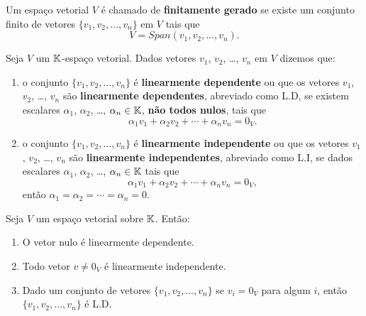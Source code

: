 \documentclass{beamer}
\begin{document}
\begin{frame}
  \begin{definicao}
    Um espaço vetorial $V$ é chamado de \textbf{finitamente gerado}  se existe um conjunto finito  de vetores $\{v_1, v_2, \dots, v_n\}$ em $V$  tais que
    \[
      V =  Span(v_1, v_2, \dots, v_n).
    \]
  \end{definicao}
\end{frame}

\begin{frame}
  \begin{definicao}
    Seja $V$ um $\mathbb{K}$-espaço vetorial.  Dados vetores $v_1$, $v_2$, \dots, $v_n$  em $V$ dizemos que:
    \begin{enumerate}[label={\roman*})]
      \item o conjunto $\{v_1, v_2, \dots, v_n\}$  é \textbf{linearmente dependente}  ou que os vetores $v_1$, $v_2$, \dots, $v_n$  são \textbf{linearmente dependentes},  abreviado como L.D,  se existem escalares
        $\alpha_1$, $\alpha_2$, \dots, $\alpha_n \in \mathbb{K}$,  \textbf{não todos nulos},  tais que
        \[
            \alpha_1v_1 + \alpha_2v_2 + \cdots + \alpha_nv_n  = 0_V.
        \]

      \item o conjunto $\{v_1, v_2, \dots, v_n\}$  é \textbf{linearmente independente}  ou que os vetores $v_1$, $v_2$, \dots, $v_n$  são \textbf{linearmente independentes},  abreviado como L.I,  se dados escalares
        $\alpha_1$, $\alpha_2$, \dots, $\alpha_n \in \mathbb{K}$  tais que
        \[
            \alpha_1v_1 + \alpha_2v_2 + \cdots + \alpha_nv_n  = 0_V,
        \]
        então $\alpha_1 =  \alpha_2 =  \cdots = \alpha_n  = 0$.
    \end{enumerate}
  \end{definicao}
\end{frame}


\begin{frame}
  \begin{proposicao}
  Seja $V$ um espaço vetorial sobre $\mathbb{K}$. Então:

  \begin{enumerate}[label={\roman*})]
    \item O vetor nulo é linearmente dependente.

    \vspace{.3cm}

    \item Todo vetor $v \ne 0_V$  é linearmente independente.

    \vspace{.3cm}

    \item Dado um conjunto de vetores $\{v_1, v_2, \dots, v_n\}$  se $v_i = 0_V$ para algum $i$,  então $\{v_1, v_2, \dots, v_n\}$ é L.D.

    \seti
  \end{enumerate}
  \end{proposicao}
\end{frame}
\end{document}
